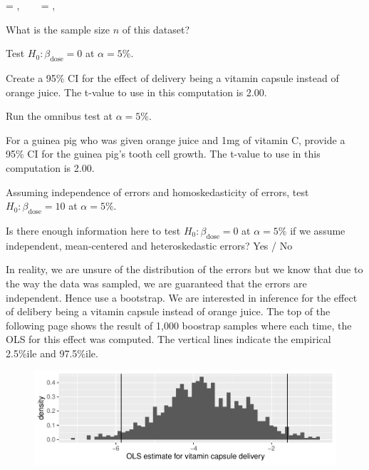 \documentclass[12pt]{article}
\begin{document}
\beqn
\XtX = , ~~~
\XtXinv = , 
\eeqn

\begin{enumerate}[(a)]

 What is the sample size $n$ of this dataset?

 Test $H_0: \beta_{\text{dose}} = 0$ at $\alpha = 5\%$. 

 Create a 95\% CI for the effect of delivery being a vitamin capsule instead of orange juice. The t-value to use in this computation is 2.00. 

 Run the omnibus test at $\alpha = 5\%$. 

 For a guinea pig who was given orange juice and 1mg of vitamin C, provide a 95\% CI for the guinea pig's tooth cell growth. The t-value to use in this computation is 2.00. 


 Assuming independence of errors and homoskedasticity of errors, test $H_0: \beta_{\text{dose}} = 10$ at $\alpha = 5\%$. 


 Is there enough information here to test $H_0: \beta_{\text{dose}} = 0$ at $\alpha = 5\%$ if we assume independent, mean-centered and heteroskedastic errors? Yes / No 

In reality, we are unsure of the distribution of the errors but we know that due to the way the data was sampled, we are guaranteed that the errors are independent. Hence use a bootstrap. We are interested in inference for the effect of delibery being a vitamin capsule instead of orange juice. The top of the following page shows the result of 1,000 boostrap samples where each time, the OLS for this effect was computed. The vertical lines indicate the empirical 2.5\%ile and 97.5\%ile.


\begin{figure}[htp]
\centering
\includegraphics[width=6.5in]{bootstrap}
\end{figure}
\FloatBarrier



\end{enumerate}
\end{document}

